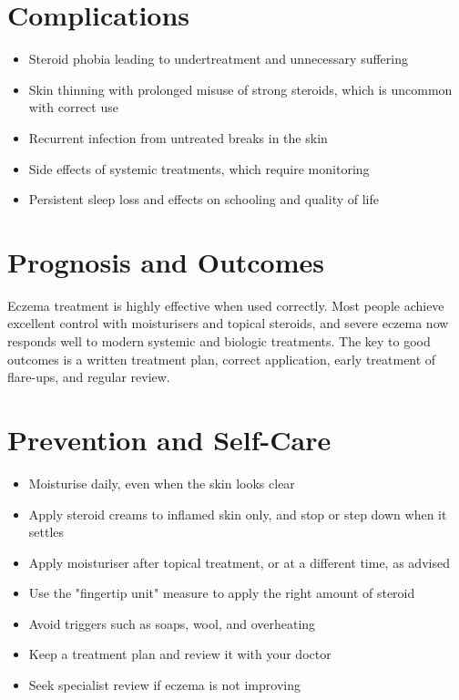 \section*{Complications}
\begin{itemize}
    \item Steroid phobia leading to undertreatment and unnecessary suffering
    \item Skin thinning with prolonged misuse of strong steroids, which is uncommon with correct use
    \item Recurrent infection from untreated breaks in the skin
    \item Side effects of systemic treatments, which require monitoring
    \item Persistent sleep loss and effects on schooling and quality of life
\end{itemize}

\section*{Prognosis and Outcomes}
Eczema treatment is highly effective when used correctly. Most people achieve excellent control with moisturisers and topical steroids, and severe eczema now responds well to modern systemic and biologic treatments. The key to good outcomes is a written treatment plan, correct application, early treatment of flare-ups, and regular review.

\section*{Prevention and Self-Care}
\begin{itemize}
    \item Moisturise daily, even when the skin looks clear
    \item Apply steroid creams to inflamed skin only, and stop or step down when it settles
    \item Apply moisturiser after topical treatment, or at a different time, as advised
    \item Use the "fingertip unit" measure to apply the right amount of steroid
    \item Avoid triggers such as soaps, wool, and overheating
    \item Keep a treatment plan and review it with your doctor
    \item Seek specialist review if eczema is not improving
\end{itemize}

